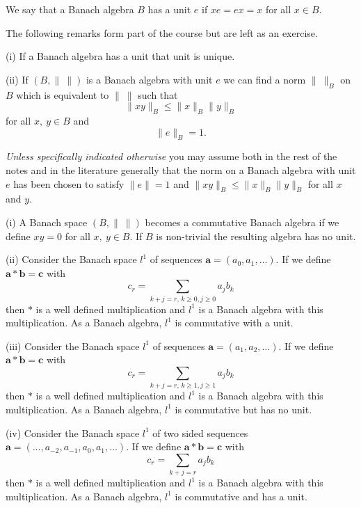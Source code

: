 \begin{definition} We say that a Banach algebra $B$ has a unit
$e$ if $xe=ex=x$ for all $x\in B$.
\end{definition}
The following remarks form part of the course but
are left as an exercise.
\begin{exercise} (i) If a Banach algebra has a unit 
that unit is unique.

(ii) If $(B,\|\ \|)$ is a Banach algebra with unit $e$
we can find a norm $\|\ \|_{B}$ on $B$ which is
equivalent to $\|\ \|$ such that
\[\|xy\|_{B}\leq \|x\|_{B}\|y\|_{B}\]
for all $x,\ y\in B$ and
\[\|e\|_{B}=1.\]
\end{exercise}
\emph{Unless specifically indicated otherwise} you
may assume both in the rest of the notes and in the
literature generally that the norm on a Banach algebra
with unit $e$
has been chosen to satisfy
$\|e\|= 1$ and $\|xy\|_{B}\leq \|x\|_{B}\|y\|_{B}$
for all $x$ and $y$.
\begin{example} (i) A Banach space $(B,\|\ \|)$ becomes
a commutative Banach algebra if we define $xy=0$ for
all $x,\ y\in B$. If $B$ is non-trivial the resulting algebra
has no unit.

(ii) Consider the Banach space $l^{1}$ of sequences
${\mathbf a}=(a_{0},a_{1},\dots)$. If we define
${\mathbf a}*{\mathbf b}={\mathbf c}$ with
\[c_{r}=\sum_{k+j=r,\,k\geq 0,j\geq 0}a_{j}b_{k}\]
then $*$ is a well defined multiplication
and $l^{1}$ is a Banach algebra with this multiplication.
As a Banach algebra, $l^{1}$ is commutative with a unit.

(iii) Consider the Banach space $l^{1}$ of sequences
${\mathbf a}=(a_{1},a_{2},\dots)$. If we define
${\mathbf a}*{\mathbf b}={\mathbf c}$ with
\[c_{r}=\sum_{k+j=r,\,k\geq 1,j\geq 1}a_{j}b_{k}\]
then $*$ is a well defined multiplication
and $l^{1}$ is a Banach algebra with this multiplication.
As a Banach algebra, $l^{1}$ is commutative but has no unit.

(iv) Consider the Banach space $l^{1}$ of 
two sided sequences
${\mathbf a}=(\dots,a_{-2},a_{-1},a_{0},a_{1},\dots)$. If we define
${\mathbf a}*{\mathbf b}={\mathbf c}$ with
\[c_{r}=\sum_{k+j=r}a_{j}b_{k}\]
then $*$ is a well defined multiplication
and $l^{1}$ is a Banach algebra with this multiplication.
As a Banach algebra, $l^{1}$ is commutative and has a unit.

\end{example}
